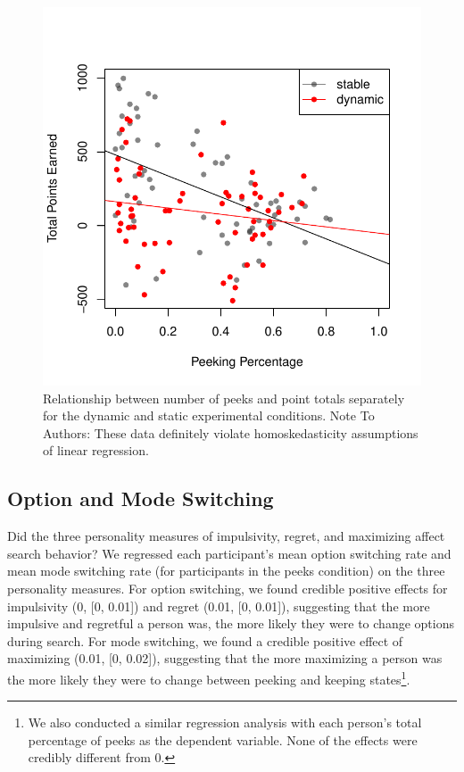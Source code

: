 \documentclass[a4paper,doc,natbib,floatsintext]{apa6}\usepackage[]{graphicx}\usepackage[]{color}
\makeatletter
\def\maxwidth{ %
  \ifdim\Gin@nat@width>\linewidth
    \linewidth
  \else
    \Gin@nat@width
  \fi
}
\newenvironment{knitrout}{}{} %
\makeatother
\begin{document}
\begin{figure}
\centering
\begin{knitrout}
\color{fgcolor}
\includegraphics[width=\maxwidth]{figure/unnamed-chunk-20-1} 

\end{knitrout}
\caption{\label{fig:peeksandpoints}Relationship between number of peeks and point totals separately for the dynamic and static experimental conditions. Note To Authors: These data definitely violate homoskedasticity assumptions of linear regression.}
\end{figure}



\subsection{Option and Mode Switching}



Did the three personality measures of impulsivity, regret, and maximizing affect search behavior?
We regressed each participant's mean option switching rate and mean mode switching rate (for participants in the peeks condition) on the three personality measures. For option switching, we found credible positive effects for impulsivity (0, [0, 0.01]) and regret (0.01, [0, 0.01]), suggesting that the more impulsive and regretful a person was, the more likely they were to change options during search. For mode switching, we found a credible positive effect of maximizing (0.01, [0, 0.02]), suggesting that the more maximizing a person was the more likely they were to change between peeking and keeping states\footnote{We also conducted a similar regression analysis with each person's total percentage of peeks as the dependent variable. None of the effects were credibly different from 0.}.
\end{document}
